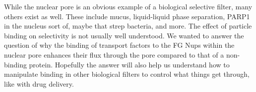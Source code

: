 %
%

While the nuclear pore is an obvious example of a biological selective filter, many others exist as well.  These include mucus, liquid-liquid phase separation, PARP1 in the nucleus sort of, maybe that strep bacteria, and more.  The effect of particle binding on selectivity is not usually well understood.  We wanted to answer the question of why the binding of transport factors to the FG Nups within the nuclear pore enhances their flux through the pore compared to that of a non-binding protein.  Hopefully the answer will also help us understand how to manipulate binding in other biological filters to control what things get through, like with drug delivery.

